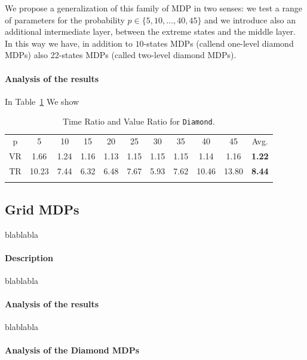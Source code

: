 We propose a generalization of this family of MDP in two senses: we test a range of parameters for the probability $p \in \{5,10,\dots,40,45\}$ and we introduce also an additional intermediate layer, between the extreme states and the middle layer. In this way we have, in addition to $10$-states MDPs (callend one-level diamond MDPs) also  22-states MDPs (called two-level diamond MDPs). 

\paragraph{Analysis of the results}
In Table~\ref{tab:diamond} We show


\begin{table}[h]																	
 \centering
 \small
 \setlength{\tabcolsep}{4.0pt}
 \renewcommand \arraystretch{1.8}
\begin{tabular}{ccccccccccc}																						
p	&	5	&	10	&	15	&	20	&	25	&	30	&	35	&	40	&	45	&	Avg.	\\	
\cmidrule(lr){1-1} \cmidrule(lr){2-10} \cmidrule(lr){11-11}
VR &	1.66	&	1.24	&	1.16	&	1.13	&	1.15	&	1.15	&	1.15	&	1.14	&	1.16	&	\textbf{1.22}	\\	
TR &	10.23	&	7.44	&	6.32	&	6.48	&	7.67	&	5.93	&	7.62	&	10.46	&	13.80	&	\textbf{8.44}	\\	\\
\end{tabular}
\caption{Time Ratio and Value Ratio for \texttt{Diamond}.}														\label{tab:diamond}								
\end{table}																						



\subsection{Grid MDPs}
blablabla
\paragraph{Description}
blablabla
\paragraph{Analysis of the results}
blablabla



\paragraph{Analysis of the Diamond MDPs}

